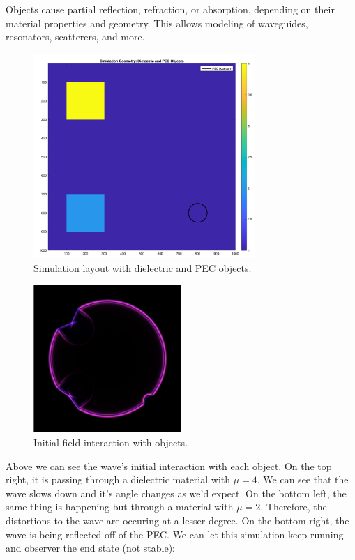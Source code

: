 \documentclass[12pt]{article}
\begin{document}
\begin{spacing}{1.5}
Objects cause partial reflection, refraction, or absorption, depending on their material properties and geometry. This allows modeling of waveguides, resonators, scatterers, and more.

\begin{figure}[h!]
    \centering
    \includegraphics[width=0.75\textwidth]{images/sim_geom}
    \caption{Simulation layout with dielectric and PEC objects.}
    \label{fig:sim_geom}
\end{figure}

\begin{figure}[h!]
    \centering
    \includegraphics[width=0.5\textwidth]{images/sim2}
    \caption{Initial field interaction with objects.}
    \label{fig:sim2}
\end{figure}

\FloatBarrier

Above we can see the wave's initial interaction with each object. On the top right, it is passing through a dielectric material with $\mu = 4$. We can see that the wave slows down and it's angle changes as we'd expect. On the bottom left, the same thing is happening but through a material with $\mu = 2$. Therefore, the distortions to the wave are occuring at a lesser degree. On the bottom right, the wave is being reflected off of the PEC. We can let this simulation keep running and observer the end state (not stable):


\end{spacing}
\end{document}
